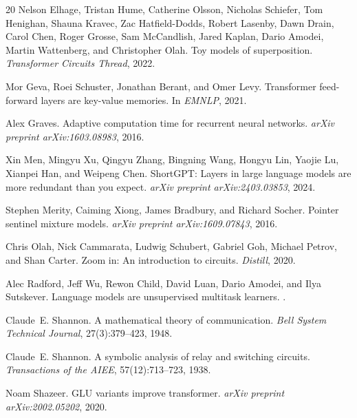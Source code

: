 \documentclass{article}
\begin{document}
\begin{thebibliography}{20}
Nelson Elhage, Tristan Hume, Catherine Olsson, Nicholas Schiefer, Tom Henighan, Shauna Kravec,
  Zac Hatfield-Dodds, Robert Lasenby, Dawn Drain, Carol Chen, Roger Grosse, Sam McCandlish,
  Jared Kaplan, Dario Amodei, Martin Wattenberg, and Christopher Olah.
\newblock Toy models of superposition.
\newblock \emph{Transformer Circuits Thread}, 2022.

Mor Geva, Roei Schuster, Jonathan Berant, and Omer Levy.
\newblock Transformer feed-forward layers are key-value memories.
\newblock In \emph{EMNLP}, 2021.

Alex Graves.
\newblock Adaptive computation time for recurrent neural networks.
\newblock \emph{arXiv preprint arXiv:1603.08983}, 2016.

Xin Men, Mingyu Xu, Qingyu Zhang, Bingning Wang, Hongyu Lin, Yaojie Lu, Xianpei Han,
  and Weipeng Chen.
\newblock ShortGPT: Layers in large language models are more redundant than you expect.
\newblock \emph{arXiv preprint arXiv:2403.03853}, 2024.

Stephen Merity, Caiming Xiong, James Bradbury, and Richard Socher.
\newblock Pointer sentinel mixture models.
\newblock \emph{arXiv preprint arXiv:1609.07843}, 2016.

Chris Olah, Nick Cammarata, Ludwig Schubert, Gabriel Goh, Michael Petrov, and Shan Carter.
\newblock Zoom in: An introduction to circuits.
\newblock \emph{Distill}, 2020.

Alec Radford, Jeff Wu, Rewon Child, David Luan, Dario Amodei, and Ilya Sutskever.
\newblock Language models are unsupervised multitask learners.
.

Claude~E. Shannon.
\newblock A mathematical theory of communication.
\newblock \emph{Bell System Technical Journal}, 27(3):379--423, 1948.

Claude~E. Shannon.
\newblock A symbolic analysis of relay and switching circuits.
\newblock \emph{Transactions of the AIEE}, 57(12):713--723, 1938.

Noam Shazeer.
\newblock GLU variants improve transformer.
\newblock \emph{arXiv preprint arXiv:2002.05202}, 2020.


\end{thebibliography}
\end{document}
